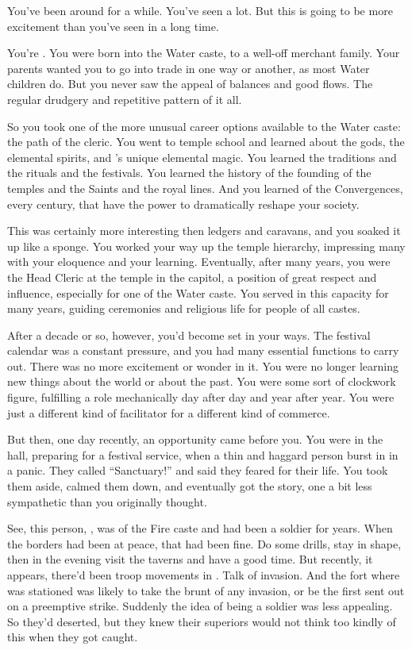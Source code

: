 \documentclass[char]{iron}
\begin{document}
\name{\cRealPriest{}}

You've been around for a while.  You've seen a lot.  But this is going to be
more excitement than you've seen in a long time.

You're \cRealPriest{\real{\full}}.  You were born into the Water
caste, to a well-off merchant family.  Your parents wanted you to go
into trade in one way or another, as most Water children do.  But you
never saw the appeal of balances and good flows.  The regular drudgery
and repetitive pattern of it all.

So you took one of the more unusual career options available to the
Water caste: the path of the cleric.  You went to temple school and
learned about the gods, the elemental spirits, and \sHomeCountry{}'s
unique elemental magic.  You learned the traditions and the rituals
and the festivals.  You learned the history of the founding of the
temples and the Saints and the royal lines.  And you learned of the
Convergences, every century, that have the power to dramatically
reshape your society.

This was certainly more interesting then ledgers and caravans, and you
soaked it up like a sponge.  You worked your way up the temple hierarchy,
impressing many with your eloquence and your learning.  Eventually, after
many years, you were the Head Cleric at the temple in the capitol, a
position of great respect and influence, especially for one of the Water
caste.  You served in this capacity for many years, guiding ceremonies
and religious life for people of all castes.

After a decade or so, however, you'd become set in your ways.  The
festival calendar was a constant pressure, and you had many essential
functions to carry out.  There was no more excitement or wonder in it.
You were no longer learning new things about the world or about the
past.  You were some sort of clockwork figure, fulfilling a role
mechanically day after day and year after year.  You were just a
different kind of facilitator for a different kind of commerce.

But then, one day recently, an opportunity came before you.  You were
in the hall, preparing for a festival service, when a thin and haggard
person burst in in a panic.  They called ``Sanctuary!'' and said they
feared for their life.  You took them aside, calmed them down, and
eventually got the story, one a bit less sympathetic than you
originally thought.

See, this person, \cFakePriest{\real{\full}}, was of the Fire caste and had
been a soldier for years.  When the borders had been at peace, that
had been fine.  Do some drills, stay in shape, then in the evening
visit the taverns and have a good time.  But recently, it appears,
there'd been troop movements in \sMulanCountry{}.  Talk of invasion.
And the fort where \cFakePriest{\real{\first}} was stationed was
likely to take the brunt of any invasion, or be the first sent out on
a preemptive strike.  Suddenly the idea of being a soldier was less
appealing.  So they'd deserted, but they knew their superiors would
not think too kindly of this when they got caught.
\end{document}
